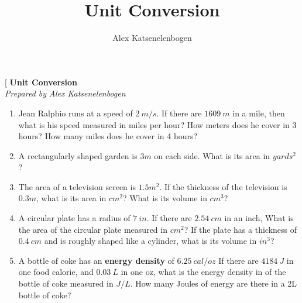 \documentclass{article}
\title{Unit Conversion}
\author{Alex Katsenelenbogen}
\begin{document}
\begin{center}[
      \Large\textbf{Unit Conversion}\\
      \large\textit{Prepared by Alex Katsenelenbogen}
   \end{center}

\begin{enumerate}

\item Jean Ralphio runs at a speed of $2\ m/s$. If there are $1609\ m$ in a mile, then what is his speed measured in miles per hour? How meters does he cover in 3 hours? How many miles does he cover in 4 hours?

\item A rectangularly shaped garden is $3m$ on each side. What is its area in $yards^2$?

\item The area of a television screen is $1.5 m^2$. If the thickness of the television is $0.3m$, what is its area in $cm^2$? What is its volume in $cm^3$?

\item A circular plate has a radius of $7\ in$. If there are $2.54\ cm$ in an inch, What is the area of the circular plate measured in $cm^2$? If the plate has a thickness of $0.4\ cm$ and is roughly shaped like a cylinder, what is its volume 
in $in^3$?

\item A bottle of coke has an \textbf{energy density} of $6.25\ cal/oz$ If there are $4184\ J$ in one food calorie, and $0.03\ L$ in one oz, what is the energy density in of the bottle of coke measured in $J/L$. How many Joules of energy are there in a 2L bottle of coke?

\end{enumerate}
\end{document}
